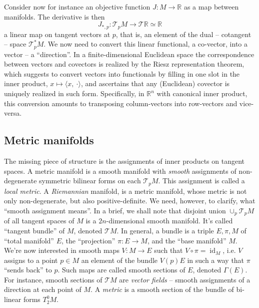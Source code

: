 Consider now for instance an objective function \( J: M \to \mathbb{R} \) as a
map between manifolds. The derivative is then \[ J_{*,p} : \mathcal{T}_pM \to
\mathcal{T}\mathbb{R}\simeq\mathbb{R} \] a linear map on tangent vectors at \(
p \), that is, an element of the dual -- cotangent -- space \( \mathcal{T}_p^*M
\). We now need to convert this linear functional, a co-vector, into a vector
-- a ``direction''. In a finite-dimensional Euclidean space the correspondence
between vectors and covectors is realized by the Riesz representation theorem,
which suggests to convert vectors into functionals by filling in one slot
in the inner product, \( x\mapsto \langle x,~\cdot\rangle \), and ascertains
that any (Euclidean) covector is uniquely realized in such form. Specifically,
in \( \mathbb{R}^n \) with canonical inner product, this conversion amounts
to transposing column-vectors into row-vectors and vice-versa.

\subsection*{Metric manifolds} \label{sec:metricMfds}

The missing piece of structure is the assignments of inner products on tangent
spaces. A metric manifold is a smooth manifold with \emph{smooth} assignments
of non-degenerate symmetric bilinear forms on each \( \mathcal{T}_pM \).  This
assignment is called a \emph{local metric}.  A \emph{Riemannian} manifold, is a
metric manifold, whose metric is not only non-degenerate, but also
positive-definite.
We need, however, to clarify, what ``smooth assignment means''.  In a brief, we
shall note that disjoint union \( \cup_p\mathcal{T}_pM \) of all tangent spaces
of \( M \) is a \( 2n \)-dimensional smooth manifold. It's called ``tangent
bundle'' of \( M \), denoted \( \mathcal{T}M \). In general, a bundle is a
triple \( E, \pi, M \) of ``total manifold'' \( E \), the ``projection'' \(
\pi: E\to M \), and the ``base manifold'' \( M \). We're now interested in
smooth maps \( V: M \to E \) such that \( V\circ\pi = \operatorname{id}_M \),
i.e. \( V \) assigns to a point \( p\in M \) an element of the bundle \( V(p) E
\) in such a way that \( \pi \) ``sends back'' to \( p \). Such maps are called
smooth sections of \( E \), denoted \( \Gamma(E) \). For instance,
smooth sections of \( \mathcal{T}M \) are \emph{vector fields} -- smooth assignments
of a direction at each point of \( M \). A \emph{metric} is a smooth section
of the bundle of bi-linear forms \( T^0_2M \).

